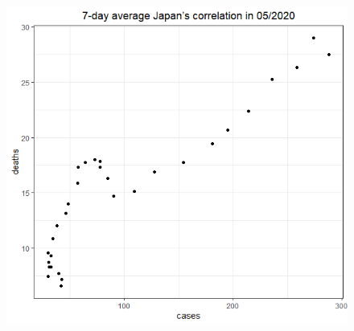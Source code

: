 \documentclass[a4paper]{article}
\theoremstyle{definition}
\begin{document}
\begin{enumerate}[1)]
\begin{figure}[H]
\begin{center}
        \includegraphics[scale = 0.3]{ix/ix.3/JPN_05_2020.png}
        

\end{center}
\end{figure}
\end{enumerate}
\end{document}
